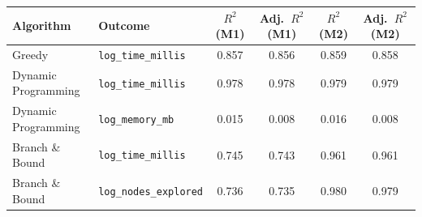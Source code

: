 \begin{tabular}{llcccc}
\toprule
\textbf{Algorithm} & \textbf{Outcome} & \textbf{$R^2$ (M1)} & \textbf{Adj.~$R^2$ (M1)} & \textbf{$R^2$ (M2)} & \textbf{Adj.~$R^2$ (M2)} \\
\midrule
Greedy & \texttt{log\_time\_millis} & 0.857 & 0.856 & 0.859 & 0.858 \\
Dynamic Programming & \texttt{log\_time\_millis} & 0.978 & 0.978 & 0.979 & 0.979 \\
Dynamic Programming & \texttt{log\_memory\_mb} & 0.015 & 0.008 & 0.016 & 0.008 \\
Branch \& Bound & \texttt{log\_time\_millis} & 0.745 & 0.743 & 0.961 & 0.961 \\
Branch \& Bound & \texttt{log\_nodes\_explored} & 0.736 & 0.735 & 0.980 & 0.979 \\
\bottomrule
\end{tabular}

